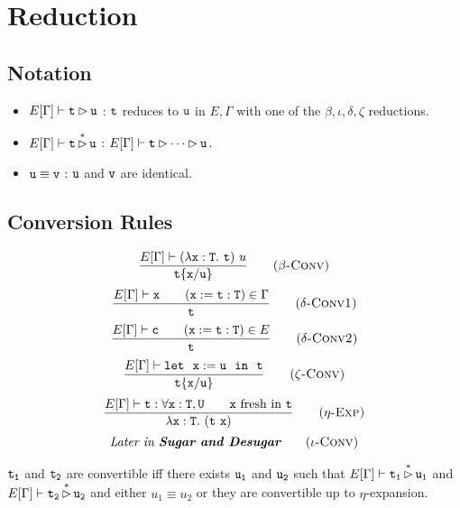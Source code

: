 \section{Reduction}

\subsection{Notation}
\begin{itemize}
    \item $E[\Gamma]\vdash \tt t\rhd u$ : $\tt t$ reduces to $\tt u$ in $E,\Gamma$ with 
    one of the $\beta,\iota,\delta,\zeta$ reductions.
    \item $E[\Gamma]\vdash \tt t\mathop{\rhd}\limits^* u$ : $E[\Gamma]\vdash\tt t\rhd\cdots\rhd u$.
    \item $\tt u\equiv v$ : $\tt u$ and $\tt v$ are identical.
\end{itemize}

\subsection{Conversion Rules}
\begin{equation*}
\frac{E[\Gamma]\vdash(\lambda{\tt x:T.\ t})\ u}
    {\tt t\{x/u\}}
    \tag{\sc $\beta$-Conv}
\end{equation*}
\begin{equation*}
\frac{E[\Gamma]\vdash{\tt x}\qquad ({\tt x:=t:T})\in\Gamma}
    {\tt t}
    \tag{\sc $\delta$-Conv1}
\end{equation*}
\begin{equation*}
\frac{E[\Gamma]\vdash{\tt c}\qquad ({\tt x:=t:T})\in E}
    {\tt t}
    \tag{\sc $\delta$-Conv2}
\end{equation*}
\begin{equation*}
\frac{E[\Gamma]\vdash \tt let\ \ x:=u\ \ in\ \ t}
    {\tt t\{x/u\}}
    \tag{\sc $\zeta$-Conv}
\end{equation*}
\begin{equation*}
\frac{E[\Gamma]\vdash \tt t:\forall x:T,U\qquad x\text{ fresh in }t}
    {\tt \lambda\tt x:T.\ (t\ x)}
    \tag{\sc $\eta$-Exp}
\end{equation*}
\begin{equation*}
    \textit{Later in \textbf{Sugar and Desugar}}
    \tag{\sc $\iota$-Conv}
\end{equation*}

\begin{Def}[Convertibility]
$\tt t_1$ and $\tt t_2$ are convertible iff there exists $\tt u_1$ and $\tt u_2$ such that 
$E[\Gamma]\vdash \tt t_1\mathop{\rhd}\limits^* u_1$ and $E[\Gamma]\vdash \tt t_2\mathop{\rhd}\limits^* u_2$ 
and either $u_1\equiv u_2$ or they are convertible up to $\eta$-expansion.
\end{Def}

